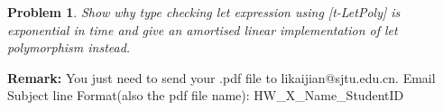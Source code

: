 \documentclass[12pt]{article}
\newtheorem{hw}{Problem}
\begin{document}
\begin{hw}\rm
	Show why type checking let expression using [t-LetPoly] is exponential in time and give an amortised linear implementation of let polymorphism instead.	
\end{hw}


\vspace{20pt}

\textbf{Remark:} You just need to send your .pdf file to {\color{blue} likaijian@sjtu.edu.cn}. Email Subject line Format(also the pdf file name): {\color{red} HW\_X\_Name\_StudentID}
\end{document}
